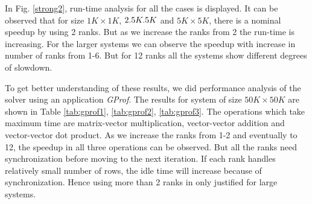 \documentclass[sigplan,screen]{acmart}
\begin{document}
In Fig. \ref{strong2}, run-time analysis for all the cases is displayed. It can be observed that for size $1K\times 1K$, $2.5K\time 2.5K$ and $5K\times 5K$, there is a nominal speedup by using 2 ranks. But as we increase the ranks from 2 the run-time is increasing. For the larger systems we can observe the speedup with increase in number of ranks from 1-6. But for 12 ranks all the systems show different degrees of slowdown. 

To get better understanding of these results, we did performance analysis of the solver using an application \emph{GProf}. The results for system of size $50K\times 50K$ are shown in Table \ref{tab:gprof1}, \ref{tab:gprof2}, \ref{tab:gprof3}. The operations which take maximum time are matrix-vector multiplication, vector-vector addition and vector-vector dot product. As we increase the ranks from 1-2 and eventually to 12, the speedup in all three operations can be observed. But all the ranks need synchronization before moving to the next iteration. If each rank handles relatively small number of rows, the idle time will increase because of synchronization. Hence using more than 2 ranks in only justified for large systems. 
\end{document}
